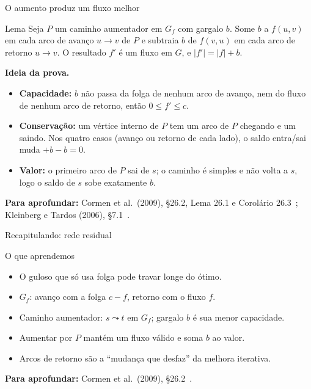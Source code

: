 \documentclass[aspectratio=169,xcolor=table]{beamer}
\newcommand{\fonte}[1]{%
  \vfill
  {\tiny\color{gray!55!black}\textbf{Para aprofundar:} #1\par}%
}
\begin{document}
\begin{frame}{O aumento produz um fluxo melhor}
  \begin{block}{Lema}
    \small
    Seja $P$ um caminho aumentador em $G_f$ com gargalo $b$. Some $b$ a $f(u,v)$ em cada arco
    de avanço $u \to v$ de $P$ e subtraia $b$ de $f(v,u)$ em cada arco de retorno $u \to v$.
    O resultado $f'$ é um fluxo em $G$, e $|f'| = |f| + b$.
  \end{block}
  \scriptsize
  \textbf{Ideia da prova.}
  \begin{itemize}
    \item \textbf{Capacidade:} $b$ não passa da folga de nenhum arco de avanço, nem do fluxo
      de nenhum arco de retorno, então $0 \le f' \le c$.
    \item \textbf{Conservação:} um vértice interno de $P$ tem um arco de $P$ chegando e um
      saindo. Nos quatro casos (avanço ou retorno de cada lado), o saldo entra/sai muda
      $+b - b = 0$.
    \item \textbf{Valor:} o primeiro arco de $P$ sai de $s$; o caminho é simples e não volta a
      $s$, logo o saldo de $s$ sobe exatamente $b$.
  \end{itemize}
  \fonte{Cormen et al.\ (2009), \S 26.2, Lema 26.1 e Corolário 26.3~\cite{cormen2009introduction};
    Kleinberg e Tardos (2006), \S 7.1~\cite{kleinberg2006algorithm}.}
\end{frame}

\begin{frame}{Recapitulando: rede residual}
  \begin{block}{O que aprendemos}
    \begin{itemize}
      \item O guloso que só usa folga pode travar longe do ótimo.
      \item $G_f$: avanço com a folga $c - f$, retorno com o fluxo $f$.
      \item Caminho aumentador: $s \leadsto t$ em $G_f$; gargalo $b$ é sua menor capacidade.
      \item Aumentar por $P$ mantém um fluxo válido e soma $b$ ao valor.
      \item Arcos de retorno são a ``mudança que desfaz'' da melhora iterativa.
    \end{itemize}
  \end{block}
  \fonte{Cormen et al.\ (2009), \S 26.2~\cite{cormen2009introduction}.}
\end{frame}

\end{document}
